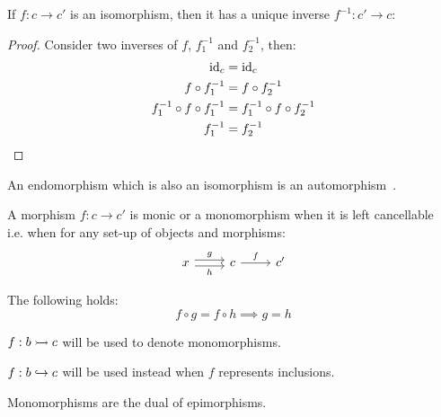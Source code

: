 \begin{theorem}
  If $f: c\to c'$ is an isomorphism, then it has a unique inverse $f^{-1}:c'\to
  c$:
  \begin{proof}
    Consider two inverses of $f$, $f^{-1}_1$ and $f^{-1}_2$, then:
    \[
      \begin{aligned}
        \mathrm{id}_c &= \mathrm{id}_c\\
        f\circ f^{-1}_1 &= f\circ f^{-1}_2\\
        f^{-1}_1 \circ f \circ f^{-1}_1 &= f^{-1}_1 \circ f \circ f^{-1}_2\\
        f^{-1}_1 &= f^{-1}_2
      \end{aligned}
    \]
  \end{proof}
\end{theorem}

\begin{definition}
  An endomorphism which is also an isomorphism is an
  automorphism~\parencite[p.~7]{riehl:category_theory_in_context}.
\end{definition}

\begin{definition}
  A morphism $f:c\to c'$ is monic or a monomorphism when it is left
  cancellable~\parencite[p.~19]{lane:working_mathematician} i.e. when for any
  set-up of objects and morphisms:
  \[\begin{tikzcd}[ampersand replacement=\&]
    x \& c \& {c'}
    \arrow["f", from=1-2, to=1-3]
    \arrow["g", shift left=1, from=1-1, to=1-2]
    \arrow["h"', shift right=1, from=1-1, to=1-2]
  \end{tikzcd}\]

  The following holds:
  \[f \circ g = f \circ h \implies g = h\]
\end{definition}

\begin{remark}
  $f:b\rightarrowtail c$ will be used to denote monomorphisms.
\end{remark}

\begin{remark}
  $f:b\hookrightarrow c$ will be used instead when $f$ represents inclusions.
\end{remark}

\begin{remark}
  Monomorphisms are the dual of epimorphisms.
\end{remark}

